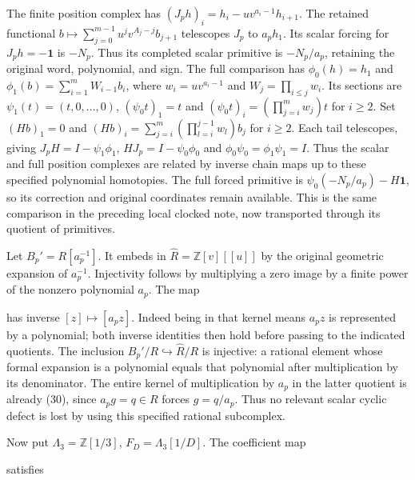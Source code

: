 The finite position complex has \((J_ph)_i=h_i-u v^{a_i-1}h_{i+1}\). The
retained functional \(b\mapsto\sum_{j=0}^{m-1}u^jv^{A_j-j}b_{j+1}\)
telescopes \(J_p\) to \(a_ph_1\). Its scalar forcing for
\(J_ph=-\mathbf1\) is \(-N_p\). Thus its completed scalar primitive is
\(-N_p/a_p\), retaining the original word, polynomial, and sign. The
full comparison has \(\phi_0(h)=h_1\) and
\(\phi_1(b)=\sum_{i=1}^m W_{i-1}b_i\), where \(w_i=uv^{a_i-1}\) and
\(W_j=\prod_{i\le j}w_i\). Its sections are
\(\psi_1(t)=(t,0,\ldots,0)\), \((\psi_0t)_1=t\) and
\((\psi_0t)_i=(\prod_{j=i}^m w_j)t\) for \(i\ge2\). Set \((Hb)_1=0\) and
\((Hb)_i=\sum_{j=i}^m(\prod_{l=i}^{j-1}w_l)b_j\) for \(i\ge2\). Each
tail telescopes, giving \(J_pH=I-\psi_1\phi_1\), \(HJ_p=I-\psi_0\phi_0\)
and \(\phi_0\psi_0=\phi_1\psi_1=I\). Thus the scalar and full position
complexes are related by inverse chain maps up to these specified
polynomial homotopies. The full forced primitive is
\(\psi_0(-N_p/a_p)-H\mathbf1\), so its correction and original
coordinates remain available. This is the same comparison in the
preceding local clocked note, now transported through its quotient of
primitives.

Let \(B_p'=R[a_p^{-1}]\). It embeds in \(\widehat R=\mathbb Z[v][[u]]\)
by the original geometric expansion of \(a_p^{-1}\). Injectivity follows
by multiplying a zero image by a finite power of the nonzero polynomial
\(a_p\). The map


has inverse \([z]\mapsto[a_pz]\). Indeed being in that kernel means
\(a_pz\) is represented by a polynomial; both inverse identities then
hold before passing to the indicated quotients. The inclusion
\(B_p'/R\hookrightarrow\widehat R/R\) is injective: a rational element
whose formal expansion is a polynomial equals that polynomial after
multiplication by its denominator. The entire kernel of multiplication
by \(a_p\) in the latter quotient is already (30), since \(a_pg=q\in R\)
forces \(g=q/a_p\). Thus no relevant scalar cyclic defect is lost by
using this specified rational subcomplex.

Now put \(\Lambda_3=\mathbb Z[1/3]\), \(F_D=\Lambda_3[1/D]\). The
coefficient map


satisfies


